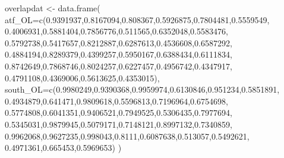 \documentclass[
]{article}
\newenvironment{Shaded}{\begin{snugshade}}{\end{snugshade}}
\newcommand{\AttributeTok}[1]{\textcolor[rgb]{0.77,0.63,0.00}{#1}}
\newcommand{\FloatTok}[1]{\textcolor[rgb]{0.00,0.00,0.81}{#1}}
\newcommand{\FunctionTok}[1]{\textcolor[rgb]{0.00,0.00,0.00}{#1}}
\newcommand{\NormalTok}[1]{#1}
\newcommand{\OtherTok}[1]{\textcolor[rgb]{0.56,0.35,0.01}{#1}}
\begin{document}
\begin{Shaded}
\begin{Highlighting}[]
\NormalTok{overlapdat }\OtherTok{\textless{}{-}} \FunctionTok{data.frame}\NormalTok{(}
  \AttributeTok{atf\_OL=}\FunctionTok{c}\NormalTok{(}\FloatTok{0.9391937}\NormalTok{,}\FloatTok{0.8167094}\NormalTok{,}\FloatTok{0.808367}\NormalTok{,}\FloatTok{0.5926875}\NormalTok{,}\FloatTok{0.7804481}\NormalTok{,}\FloatTok{0.5559549}\NormalTok{,}
           \FloatTok{0.4006931}\NormalTok{,}\FloatTok{0.5881404}\NormalTok{,}\FloatTok{0.7856776}\NormalTok{,}\FloatTok{0.511565}\NormalTok{,}\FloatTok{0.6352048}\NormalTok{,}\FloatTok{0.5583476}\NormalTok{,}
           \FloatTok{0.5792738}\NormalTok{,}\FloatTok{0.5417657}\NormalTok{,}\FloatTok{0.8212887}\NormalTok{,}\FloatTok{0.6287613}\NormalTok{,}\FloatTok{0.4536608}\NormalTok{,}\FloatTok{0.6587292}\NormalTok{,}
           \FloatTok{0.4884194}\NormalTok{,}\FloatTok{0.8289379}\NormalTok{,}\FloatTok{0.4399257}\NormalTok{,}\FloatTok{0.5950167}\NormalTok{,}\FloatTok{0.6388434}\NormalTok{,}\FloatTok{0.6111834}\NormalTok{,}
           \FloatTok{0.8742649}\NormalTok{,}\FloatTok{0.7868746}\NormalTok{,}\FloatTok{0.8024257}\NormalTok{,}\FloatTok{0.6227457}\NormalTok{,}\FloatTok{0.4956742}\NormalTok{,}\FloatTok{0.4347917}\NormalTok{,}
           \FloatTok{0.4791108}\NormalTok{,}\FloatTok{0.4369006}\NormalTok{,}\FloatTok{0.5613625}\NormalTok{,}\FloatTok{0.4353015}\NormalTok{),}
  \AttributeTok{south\_OL=}\FunctionTok{c}\NormalTok{(}\FloatTok{0.9980249}\NormalTok{,}\FloatTok{0.9390368}\NormalTok{,}\FloatTok{0.9959974}\NormalTok{,}\FloatTok{0.6130846}\NormalTok{,}\FloatTok{0.951234}\NormalTok{,}\FloatTok{0.5851891}\NormalTok{,}
             \FloatTok{0.4934879}\NormalTok{,}\FloatTok{0.641471}\NormalTok{,}\FloatTok{0.9809618}\NormalTok{,}\FloatTok{0.5596813}\NormalTok{,}\FloatTok{0.7196964}\NormalTok{,}\FloatTok{0.6754698}\NormalTok{,}
             \FloatTok{0.5774808}\NormalTok{,}\FloatTok{0.6041351}\NormalTok{,}\FloatTok{0.9406521}\NormalTok{,}\FloatTok{0.7949525}\NormalTok{,}\FloatTok{0.5306435}\NormalTok{,}\FloatTok{0.7977694}\NormalTok{,}
             \FloatTok{0.5345031}\NormalTok{,}\FloatTok{0.9879945}\NormalTok{,}\FloatTok{0.5079171}\NormalTok{,}\FloatTok{0.7148121}\NormalTok{,}\FloatTok{0.8997132}\NormalTok{,}\FloatTok{0.7340859}\NormalTok{,}
             \FloatTok{0.9962068}\NormalTok{,}\FloatTok{0.9627235}\NormalTok{,}\FloatTok{0.998043}\NormalTok{,}\FloatTok{0.8111}\NormalTok{,}\FloatTok{0.6087638}\NormalTok{,}\FloatTok{0.513057}\NormalTok{,}\FloatTok{0.5492621}\NormalTok{,}
             \FloatTok{0.4971361}\NormalTok{,}\FloatTok{0.665453}\NormalTok{,}\FloatTok{0.5969653}\NormalTok{)}
\NormalTok{)}



\end{Highlighting}
\end{Shaded}
\end{document}
